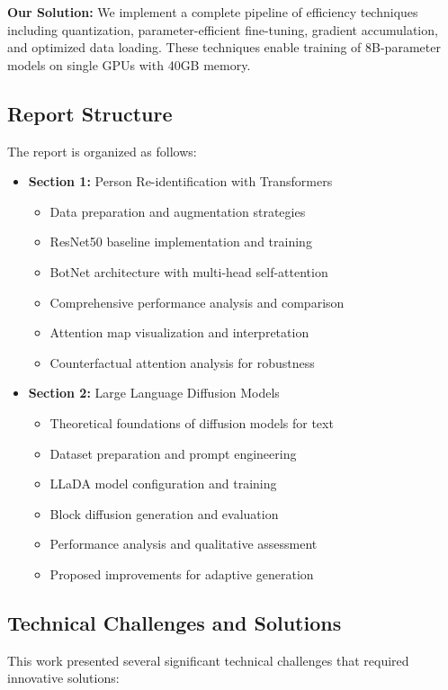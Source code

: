 \documentclass[a4paper,12pt]{article}
\begin{document}
\textbf{Our Solution:} We implement a complete pipeline of efficiency techniques including quantization, parameter-efficient fine-tuning, gradient accumulation, and optimized data loading. These techniques enable training of 8B-parameter models on single GPUs with 40GB memory.

\subsection{Report Structure}
The report is organized as follows:

\begin{itemize}
    \item \textbf{Section 1:} Person Re-identification with Transformers
    \begin{itemize}
        \item Data preparation and augmentation strategies
        \item ResNet50 baseline implementation and training
        \item BotNet architecture with multi-head self-attention
        \item Comprehensive performance analysis and comparison
        \item Attention map visualization and interpretation
        \item Counterfactual attention analysis for robustness
    \end{itemize}
    \item \textbf{Section 2:} Large Language Diffusion Models
    \begin{itemize}
        \item Theoretical foundations of diffusion models for text
        \item Dataset preparation and prompt engineering
        \item LLaDA model configuration and training
        \item Block diffusion generation and evaluation
        \item Performance analysis and qualitative assessment
        \item Proposed improvements for adaptive generation
    \end{itemize}
\end{itemize}

\subsection{Technical Challenges and Solutions}
This work presented several significant technical challenges that required innovative solutions:
\end{document}
